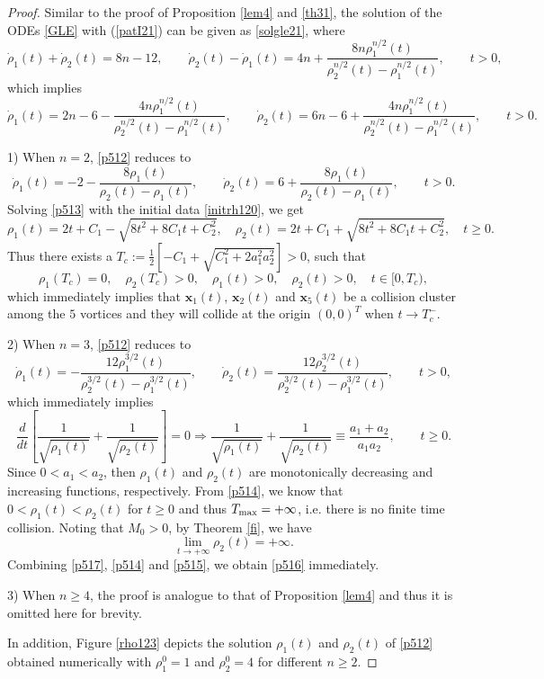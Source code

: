 \documentclass{aims}
\theoremstyle{plain}
\theoremstyle{definition}
\newcommand{\be} {\begin{equation}}
\newcommand{\ee}{\end{equation}}
\begin{document}
\begin{proof} Similar to the proof of Proposition \ref{lem4} and \ref{th31},
the solution of the ODEs
\eqref{GLE} with (\ref{patI21}) can be given as
 \eqref{solgle21}, where
\begin{equation}\label{p51}
\dot\rho_1(t)+\dot\rho_2(t)=8n-12, \qquad
\dot\rho_2(t)-\dot\rho_1(t)=4n+\frac{
8n\rho_1^{n/2}(t)}
{\rho_2^{n/2}(t)-\rho_1^{n/2}(t)}, \qquad t>0, \nonumber
\end{equation}
which implies
\be\label{p512}
\dot\rho_1(t)=2n-6-\frac{4n\rho_1^{n/2}(t)}
{\rho_2^{n/2}(t)-\rho_1^{n/2}(t)},\qquad \dot\rho_2(t)=6n-6+\frac{4n
\rho_1^{n/2}(t)}
{\rho_2^{n/2}(t)-\rho_1^{n/2}(t)},\qquad t>0.
\ee



1) When $n=2$, \eqref{p512} reduces to
\be\label{p513}
\dot\rho_1(t)=-2-\frac{8\rho_1(t)}
{\rho_2(t)-\rho_1(t)},\qquad \dot\rho_2(t)=6+\frac{8
\rho_1(t)}
{\rho_2(t)-\rho_1(t)},\qquad t>0.
\ee
Solving \eqref{p513} with the initial data \eqref{initrh120}, we get
\be
\rho_1(t)=2t+C_1-\sqrt{8t^2+8C_1t+C_2^2}, \quad
\rho_2(t)=2t+C_1+\sqrt{8t^2+8C_1t+C_2^2}, \quad t\ge0. \nonumber
\ee
Thus there exists a $T_c:=\frac{1}{2}\left[-C_1+\sqrt{C_1^2+2a_1^2a_2^2}\right]>0$,
such that
\be
\rho_1(T_c)=0,\quad \rho_2(T_c)>0,\quad  \rho_1(t)>0,\quad \rho_2(t)>0,\quad t\in[0, T_c), \nonumber
\ee
which immediately implies that  $\mathbf x_1(t)$, $\mathbf x_2(t)$ and $\mathbf x_5(t)$ be a collision cluster among the $5$ vortices and they will
collide at the origin $(0,0)^T$  when $t\to T_c^-$.

 2) When $n=3$, \eqref{p512} reduces to
 \be\label{p515}
\dot\rho_1(t)=-\frac{12\rho_1^{3/2}(t)}{
\rho_2^{3/2}(t)-\rho_1^{3/2}(t)},\qquad
\dot\rho_2(t)=\frac{12\rho_2^{3/2}(t)}{\rho_2^{3/2}(t)-\rho_1^{3/2}(t)},
\qquad t>0,
\ee
which immediately implies
\be \label{p514}
\frac{d}{dt}\left[\frac{1}{\sqrt{\rho_1(t)}}+\frac{1}{\sqrt{\rho_2(t)}}\right]=0
\Longrightarrow \frac{1}{\sqrt{\rho_1(t)}}+\frac{1}{\sqrt{\rho_2(t)}}\equiv
\frac{a_1+a_2}{a_1a_2}, \qquad t\ge0.
\ee
Since $0<a_1<a_2$, then $\rho_1(t)$ and  $\rho_2(t)$ are monotonically decreasing and increasing functions, respectively. From \eqref{p514},
we know that $0<\rho_1(t)<\rho_2(t)$ for $t\ge0$ and thus $T_{\rm max}=+\infty$, i.e. there is no finite time collision. Noting that $M_0>0$, by Theorem
\ref{fi}, we have
\be\label{p517}
\lim_{t\rightarrow+\infty}\rho_2(t)=+\infty.
\ee
Combining \eqref{p517}, \eqref{p514} and \eqref{p515}, we obtain
\eqref{p516} immediately.


3) When $n\geq 4$, the proof is analogue to that
of Proposition \ref{lem4} and thus it is
omitted here for brevity.


In addition,
Figure \ref{rho123} depicts the solution
$\rho_1(t)$ and $\rho_2(t)$ of \eqref{p512} obtained numerically with $\rho_1^0=1$ and $\rho_2^0=4$ for different $n\ge2$.
\end{proof}
\end{document}
